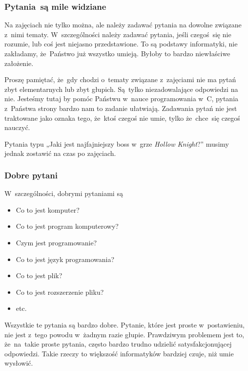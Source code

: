 \documentclass[10pt,t]{beamer}
\begin{document}
\begin{frame}
  \frametitle{Pytania~są mile widziane}


  Na zajęciach nie tylko można, ale \alert{należy} zadawać pytania
  na dowolne związane z~nimi tematy. W~szczególności
  \alert{należy} zadawać pytania, jeśli czegoś~się nie rozumie, lub coś
  jest niejasno przedstawione. To są podstawy informatyki, \alert{nie}
  zakładamy, że~Państwo już wszystko umieją. Byłoby to bardzo
  niewłaściwe założenie.

  Proszę pamiętać, że~gdy chodzi o~tematy związane z~zajęciami
  \alert{nie} ma pytań zbyt elementarnych lub zbyt głupich. Są~tylko
  niezadowalające odpowiedzi na nie. Jesteśmy tutaj by pomóc
  Państwu w~nauce programowania w~C, pytania z~Państwa strony bardzo nam to
  zadanie ułatwiają. Zadawania pytań nie jest traktowane jako oznaka tego,
  że~ktoś czegoś nie umie, tylko że~chce~się czegoś nauczyć.

  Pytania typu „Jaki jest najfajniejszy boss w~grze \textit{Hollow
    Knight}?” musimy jednak zostawić na czas po zajęciach.

\end{frame}





\begin{frame}
  \frametitle{Dobre pytani}


  W~szczególności, dobrymi pytaniami są
  \begin{itemize}

  \item Co to jest komputer?

  \item Co to jest program komputerowy?

  \item Czym jest programowanie?

  \item Co to jest język programowania?

  \item Co to jest plik?

  \item Co to jest rozszerzenie pliku?

  \item etc.

  \end{itemize}

  Wszystkie te pytania są bardzo dobre. Pytanie, które jest proste
  w~postawieniu, nie jest z~tego powodu w~żadnym razie głupie. Prawdziwym
  problemem jest to, że~na~takie proste pytania, często bardzo trudno
  udzielić satysfakcjonującej odpowiedzi. Takie rzeczy to większość
  informatyków bardziej czuje, niż umie wysłowić.

\end{frame}
\end{document}
